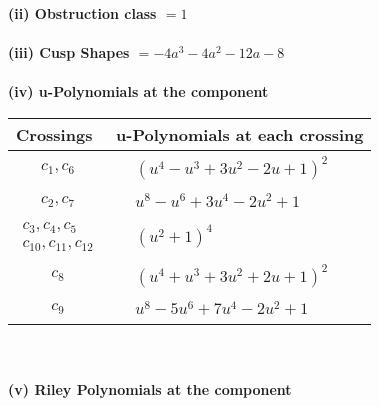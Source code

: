 \documentclass[1p]{elsarticle_modified}
\theoremstyle{definition}
\begin{document}
\flushleft \textbf{(ii) Obstruction class $= 1$}\\~\\
\flushleft \textbf{(iii) Cusp Shapes $= -4 a^3-4 a^2-12 a-8$}\\~\\
\newpage\renewcommand{\arraystretch}{1}
\flushleft \textbf{(iv) u-Polynomials at the component}\newline \\
\begin{tabular}{m{50pt}|m{274pt}}
Crossings & \hspace{64pt}u-Polynomials at each crossing \\
\hline $$\begin{aligned}c_{1},c_{6}\end{aligned}$$&$\begin{aligned}
&(u^4- u^3+3 u^2-2 u+1)^2
\end{aligned}$\\
\hline $$\begin{aligned}c_{2},c_{7}\end{aligned}$$&$\begin{aligned}
&u^8- u^6+3 u^4-2 u^2+1
\end{aligned}$\\
\hline $$\begin{aligned}c_{3},c_{4},c_{5}\\c_{10},c_{11},c_{12}\end{aligned}$$&$\begin{aligned}
&(u^2+1)^4
\end{aligned}$\\
\hline $$\begin{aligned}c_{8}\end{aligned}$$&$\begin{aligned}
&(u^4+u^3+3 u^2+2 u+1)^2
\end{aligned}$\\
\hline $$\begin{aligned}c_{9}\end{aligned}$$&$\begin{aligned}
&u^8-5 u^6+7 u^4-2 u^2+1
\end{aligned}$\\
\hline
\end{tabular}\\~\\
\newpage\renewcommand{\arraystretch}{1}
\flushleft \textbf{(v) Riley Polynomials at the component}\newline \\
\end{document}
